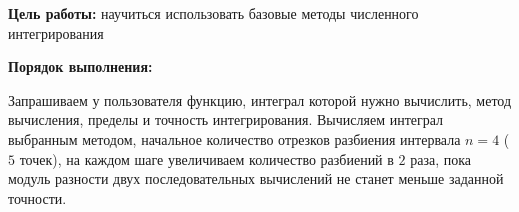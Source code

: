 \documentclass[10pt,a4paper]{article}
\begin{document}
    

    \textbf{Цель работы:}
    научиться использовать базовые методы численного интегрирования

    \textbf{Порядок выполнения:}

    Запрашиваем у пользователя функцию, интеграл которой нужно вычислить,
    метод вычисления, пределы и точность интегрирования.
    Вычисляем интеграл выбранным методом, начальное количество отрезков разбиения интервала $n=4$ ($5$ точек),
    на каждом шаге увеличиваем количество разбиений в $2$ раза,
    пока модуль разности двух последовательных вычислений не станет меньше заданной точности.

    \lstset{
        extendedchars,
        numbers=left,
        basicstyle=\ttfamily\small,
        numberstyle=\ttfamily\small,
        inputencoding=cp1251
    }
    
\end{document}
